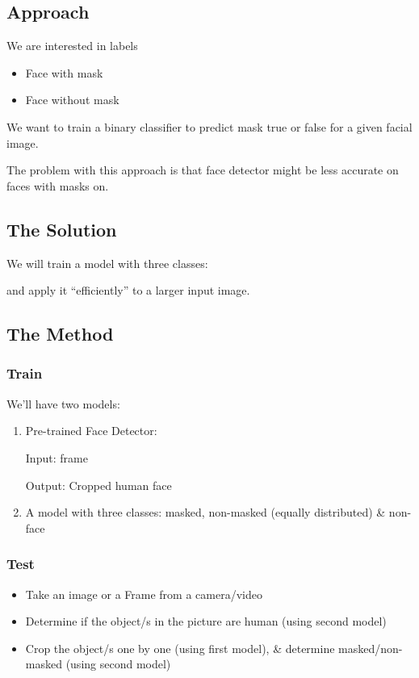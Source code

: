 \subsection{Approach}
We are interested in labels
\begin{itemize}
    \item Face with mask
    \item Face without mask
\end{itemize}

We want to train a binary classifier to predict mask true or false for a given facial image.


The problem with this approach is that face detector might be less accurate on faces with masks on.

\subsection{The Solution}
We will train a model with three classes:

and apply it “efficiently” to a larger input image.

\subsection{The Method}
\subsubsection{Train}
We'll have two models:
\begin{enumerate}
    \item Pre-trained Face Detector:

        Input: frame

	    Output: Cropped human face
    \item A model with three classes: masked, non-masked (equally distributed) \& non-face
\end{enumerate}


\subsubsection{Test}
\begin{itemize}
    \item Take an image or a Frame from a camera/video
    \item Determine if the object/s in the picture are human (using second model)
    \item Crop the object/s one by one (using first model), \& determine masked/non-masked (using second model)
\end{itemize}


